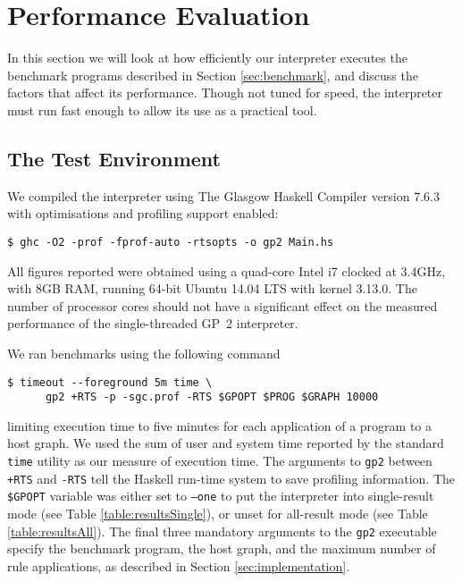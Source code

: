 \section{Performance Evaluation}
\label{sec:performanceevaluation}

In this section we will look at how efficiently our interpreter executes the benchmark programs described in Section \ref{sec:benchmark}, and discuss the factors that affect its performance. Though not tuned for speed, the interpreter must run fast enough to allow its use as a practical tool.




\subsection{The Test Environment}

We compiled the interpreter using The Glasgow Haskell Compiler\cite{ghc} version 7.6.3 with optimisations and profiling support enabled:

\begin{verbatim}
$ ghc -O2 -prof -fprof-auto -rtsopts -o gp2 Main.hs
\end{verbatim}

All figures reported were obtained using a quad-core Intel i7 clocked at 3.4GHz, with 8GB RAM, running 64-bit Ubuntu 14.04 LTS with kernel 3.13.0. The number of processor cores should not have a significant effect on the measured performance of the single-threaded GP~2 interpreter.

We ran benchmarks using the following command

\begin{verbatim}
$ timeout --foreground 5m time \
      gp2 +RTS -p -sgc.prof -RTS $GPOPT $PROG $GRAPH 10000
\end{verbatim}

\noindent
limiting execution time to five minutes for each application of a program to a host graph. We used the sum of user and system time reported by the standard \texttt{time} utility as our measure of execution time.
The arguments to \texttt{gp2} between \texttt{+RTS} and \texttt{-RTS} tell the Haskell run-time system to save profiling information.  The \texttt{\$GPOPT} variable was either set to \texttt{--one} to put the interpreter into single-result mode (see Table \ref{table:resultsSingle}), or unset for all-result mode (see Table \ref{table:resultsAll}).
The final three mandatory arguments to the \texttt{gp2} executable specify the benchmark program, the host graph, and the maximum number of rule applications, as described in Section \ref{sec:implementation}.

